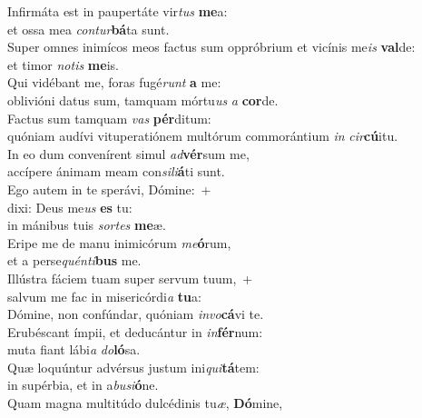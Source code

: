 \oddverse Infirmáta est in paupertáte vir\textit{tus} \textbf{me}a:~\*\\
\oddverse et ossa mea \textit{con}\textit{tur}\textbf{bá}ta sunt.\\
\evenverse Super omnes inimícos meos factus sum oppróbrium et vicínis me\textit{is} \textbf{val}de:~\*\\
\evenverse et timor \textit{no}\textit{tis} \textbf{me}is.\\
\oddverse Qui vidébant me, foras fugé\textit{runt} \textbf{a} me:~\*\\
\oddverse oblivióni datus sum, tamquam mórtu\textit{us} \textit{a} \textbf{cor}de.\\
\evenverse Factus sum tamquam \textit{vas} \textbf{pér}ditum:~\*\\
\evenverse quóniam audívi vituperatiónem multórum commorántium \textit{in} \textit{cir}\textbf{cú}itu.\\
\oddverse In eo dum convenírent simul \textit{ad}\textbf{vér}sum me,~\*\\
\oddverse accípere ánimam meam con\textit{si}\textit{li}\textbf{á}ti sunt.\\
\evenverse Ego autem in te sperávi, Dómine:~+\\
\evenverse  dixi: Deus me\textit{us} \textbf{es} tu:~\*\\
\evenverse in mánibus tuis \textit{sor}\textit{tes} \textbf{me}æ.\\
\oddverse Eripe me de manu inimicórum \textit{me}\textbf{ó}rum,~\*\\
\oddverse et a perse\textit{quén}\textit{ti}\textbf{bus} me.\\
\evenverse Illústra fáciem tuam super servum tuum,~+\\
\evenverse  salvum me fac in misericórdi\textit{a} \textbf{tu}a:~\*\\
\evenverse Dómine, non confúndar, quóniam \textit{in}\textit{vo}\textbf{cá}vi te.\\
\oddverse Erubéscant ímpii, et deducántur in \textit{in}\textbf{fér}num:~\*\\
\oddverse muta fiant lábi\textit{a} \textit{do}\textbf{ló}sa.\\
\evenverse Quæ loquúntur advérsus justum ini\textit{qui}\textbf{tá}tem:~\*\\
\evenverse in supérbia, et in a\textit{bu}\textit{si}\textbf{ó}ne.\\
\oddverse Quam magna multitúdo dulcédinis tu\textit{æ}, \textbf{Dó}mine,~\*\\

